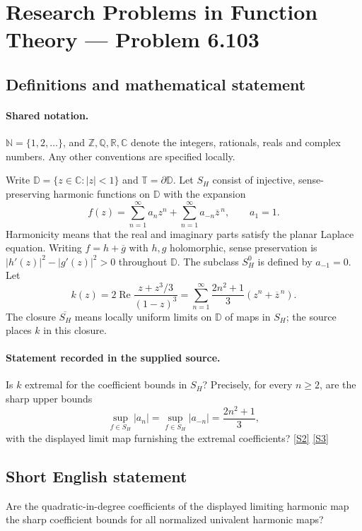 \documentclass[11pt]{article}
\newcommand{\sref}[2]{\hyperlink{source:#1:#2}{[S#2]}}
\begin{document}
\section{Research Problems in Function Theory — Problem 6.103}\label{statement}

\subsection{Definitions and mathematical statement}

\paragraph{Shared notation.}$\mathbb N=\{1,2,\ldots\}$, and $\mathbb Z,\mathbb Q,\mathbb R,\mathbb C$ denote the integers, rationals, reals and complex numbers. Any other conventions are specified locally.


Write $\mathbb D=\{z\in\mathbb C:|z|<1\}$ and $\mathbb T=\partial\mathbb D$. Let $S_H$ consist of injective, sense-preserving harmonic functions on $\mathbb D$ with the expansion
\[f(z)=\sum_{n=1}^{\infty}a_nz^n+\sum_{n=1}^{\infty}a_{-n}\overline z^{\,n},\qquad a_1=1.\]
Harmonicity means that the real and imaginary parts satisfy the planar Laplace equation. Writing $f=h+\overline g$ with $h,g$ holomorphic, sense preservation is $|h'(z)|^2-|g'(z)|^2>0$ throughout $\mathbb D$. The subclass $S_H^0$ is defined by $a_{-1}=0$.
Let
\[k(z)=2\operatorname{Re}\frac{z+z^3/3}{(1-z)^3}
=\sum_{n=1}^{\infty}\frac{2n^2+1}{3}(z^n+\overline z^{\,n}).\]
The closure $\overline{S_H}$ means locally uniform limits on $\mathbb D$ of maps in $S_H$; the source places $k$ in this closure.
\paragraph{Statement recorded in the supplied source.}
Is $k$ extremal for the coefficient bounds in $S_H$? Precisely, for every $n\geq2$, are the sharp upper bounds
\[\sup_{f\in S_H}|a_n|=\sup_{f\in S_H}|a_{-n}|=\frac{2n^2+1}{3},\]
with the displayed limit map furnishing the extremal coefficients? \sref{statement}{2} \sref{statement}{3}
\subsection{Short English statement}
Are the quadratic-in-degree coefficients of the displayed limiting harmonic map the sharp coefficient bounds for all normalized univalent harmonic maps?
\end{document}
